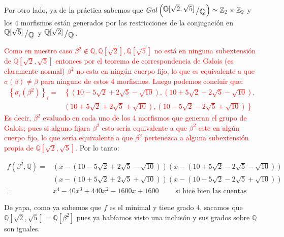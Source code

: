 \documentclass[11pt]{article}
\newcommand{\Q}{\mathbb{Q}}
\newcommand{\Z}{\mathbb{Z}}
\newcommand{\sett}[1]{\left\lbrace#1\right\rbrace}
\newcommand{\quotient}[2]{{\raisebox{.2em}{$#1$}\left/\raisebox{-.2em}{$#2$}\right.}}
\numberwithin{theorem}{subsection}
\begin{document}
\begin{enumerate}
\begin{itemize}
		Por otro lado, ya de la pr\'actica sabemos que $Gal \left(\quotient{\Q[\sqrt{2}, \sqrt{5 }]}{\Q}\right) \simeq \Z_2 \times \Z_2$ y los $4$ morfismos est\'an generados por las restricciones de la conjugaci\'on en $\quotient{\Q[\sqrt{5 }]}{\Q}$ y $\quotient{\Q[\sqrt{2}]}{\Q}$.
		
		\textcolor{red}{Como en nuestro caso $\beta^2 \not\in  \Q,  \Q[\sqrt{2}],  \Q[\sqrt{5 }]$ no est\'a en ninguna subextensi\'on de $\Q[\sqrt{2}, \sqrt{5}]$ entonces por el teorema de correspondencia de Galois (es claramente normal) $\beta^2$ no esta en ning\'un cuerpo fijo, lo que es equivalente a que $\sigma(\beta) \neq \beta$ para ninguno de estos 4 morfismos. Luego podemos concluir que:
			\begin{equation*}
			\begin{aligned}
			\sett{\sigma_i(\beta^2)}_i = & \left\lbrace \left(10 -5\sqrt{2} + 2\sqrt{5} - \sqrt{10}\right), \left(10 +5\sqrt{2} - 2\sqrt{5} - \sqrt{10}\right), \right.\\ & \left. \left(10 +5\sqrt{2} + 2\sqrt{5} + \sqrt{10}\right), \left(10 -5\sqrt{2} - 2\sqrt{5} + \sqrt{10}\right) \right\rbrace
			\end{aligned}
			\end{equation*}
			Es decir, $\beta^2$ evaluado en cada uno de los 4 morfismos que generan el grupo de Galois; pues si alguno fijara $\beta^2$ esto ser\'ia equivalente a que $\beta^2$ este en alg\'un cuerpo fijo, lo que ser\'ia equivalente a que $\beta^2$ pertenezca a alguna subextensi\'on propia de $\Q[\sqrt{2}, \sqrt{5}]$.
		} Por lo tanto:
		
		\begin{equation*}
			\begin{aligned}
				f \left(\beta^2, \Q\right) = & \left(x - \left(10 -5\sqrt{2} + 2\sqrt{5} - \sqrt{10}\right)\right)\left(x - \left(10 +5\sqrt{2} - 2\sqrt{5} - \sqrt{10}\right)\right) \\
				& \left(x - \left(10 +5\sqrt{2} + 2\sqrt{5} + \sqrt{10}\right)\right)\left(x - \left(10 -5\sqrt{2} - 2\sqrt{5} + \sqrt{10}\right)\right) \\
				= & x^4 - 40x^3 + 440x^2 - 1600 x +1600 \qquad \text{ si hice bien las cuentas}
			\end{aligned}
		\end{equation*}
		
		De yapa, como ya sabemos que $f$ es el minimal y tiene grado $4$, sacamos que $\Q[\sqrt{2}, \sqrt{5}] = \Q[\beta^2]$ pues  ya hab\'iamos visto una inclus\'on y sus grados sobre $\Q$ son iguales.
		

\end{itemize}
\end{enumerate}
\end{document}
